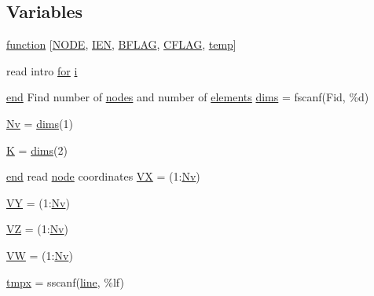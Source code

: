 \subsection*{Variables}
\begin{DoxyCompactItemize}
\item 
\hyperlink{a00608_ad05f120037604fa1d266099279d850da}{function} \mbox{[}\hyperlink{a00605_a28010846a3742b3c2c07f00b1f1536ff}{N\+O\+DE}, \hyperlink{a00608_ada37e689768b959686f183a3d534464b}{I\+EN}, \hyperlink{a00608_a2631e3df74fb2c7ff87a8ab5c4dabd4b}{B\+F\+L\+AG}, \hyperlink{a00608_a10675f132896e92909100dff33d2eca1}{C\+F\+L\+AG}, \hyperlink{a00608_a66be333d3079c1ecfec40ed090608507}{temp}\mbox{]}
\item 
read intro \hyperlink{a00623_ad1e7380d51df1e0043d24d3c8a860e0a}{for} \hyperlink{a00608_afb6aca53df96564f2adf086c942453ec}{i}
\item 
\hyperlink{a00608_afb358f48b1646c750fb9da6c6585be2b}{end} Find number of \hyperlink{a00608_a9fd973fb7dcbed4123ae5eb2f3868e61}{nodes} and number of \hyperlink{a00617_aa9aaa650bacb9b91c82437c2ce48f50c}{elements} \hyperlink{a00608_a3c9228983ba1c014121246254d146e96}{dims} = fscanf(Fid, \textquotesingle{}\%d\textquotesingle{})
\item 
\hyperlink{a00608_a664a2a7a8ba4f45899cfc3b5a7cbab06}{Nv} = \hyperlink{a00608_a3c9228983ba1c014121246254d146e96}{dims}(1)
\item 
\hyperlink{a00608_a16e4ef534cec559430e07e05eb71c719}{K} = \hyperlink{a00608_a3c9228983ba1c014121246254d146e96}{dims}(2)
\item 
\hyperlink{a00608_afb358f48b1646c750fb9da6c6585be2b}{end} read \hyperlink{a00611_adf51fe9945b6ca147057cc27ff639d0f}{node} coordinates \hyperlink{a00608_aa139eddff8cde21c2eaac5bb334c2ace}{VX} = (1\+:\hyperlink{a00608_a664a2a7a8ba4f45899cfc3b5a7cbab06}{Nv})
\item 
\hyperlink{a00608_a2bd58f70e255b7ce76fae8d4c8359b5d}{VY} = (1\+:\hyperlink{a00608_a664a2a7a8ba4f45899cfc3b5a7cbab06}{Nv})
\item 
\hyperlink{a00608_a862812783fd5a84e41cd43ab6ffab8dc}{VZ} = (1\+:\hyperlink{a00608_a664a2a7a8ba4f45899cfc3b5a7cbab06}{Nv})
\item 
\hyperlink{a00608_aad94953c669725e25ac55b2c00f7a400}{VW} = (1\+:\hyperlink{a00608_a664a2a7a8ba4f45899cfc3b5a7cbab06}{Nv})
\item 
\hyperlink{a00608_ad5e51b5cb1c4e21e4a0fce198aee3879}{tmpx} = sscanf(\hyperlink{a00608_a1d1b0d42391bd99b4214d9216b163807}{line}, \textquotesingle{}\%lf\textquotesingle{})

\end{DoxyCompactItemize}
